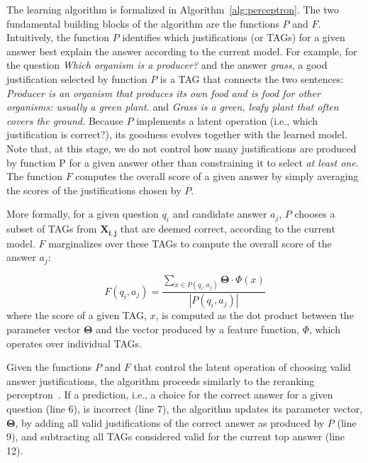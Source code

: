 The learning algorithm is formalized in Algorithm~\ref{alg:perceptron}. The two fundamental building blocks of the algorithm are the functions $P$ and $F$. 
Intuitively, the function $P$ identifies which justifications (or TAGs) for a given answer best explain the answer according to the current model. For example, for the question {\em Which organism is a producer?} and the answer {\em grass}, a good justification selected by function $P$ is a TAG that connects the two sentences: {\em Producer is an organism that produces its own food and is food for other organisms: usually a green plant.} and {\em Grass is a green, leafy plant that often covers the ground.} 
Because $P$ implements a latent operation (i.e., which justification is correct?), its goodness evolves together with the learned model. 
Note that, at this stage, we do not control how many justifications are produced by function P for a given answer other than constraining it to select {\em at least one}. The function $F$ computes the overall score of a given answer by simply averaging the scores of the justifications chosen by $P$. 

More formally, for a given question $q_i$ and candidate answer $a_j$, $P$ chooses a subset of TAGs from $\boldsymbol{X_{i,j}}$ that are deemed correct, according to the current model. $F$ marginalizes over these TAGs to compute the overall score of the answer $a_j$:

\begin{equation}
\label{eq:F}
F(q_i, a_j) = \frac{\sum_{x \in P(q_i, a_j)} \boldsymbol{\Theta} \cdot \Phi(x)}{|P(q_i, a_j)|}
\end{equation}
where the score of a given TAG, $x$, is computed as the dot product between the parameter vector $\boldsymbol{\Theta}$  and the vector produced by a feature function, $\Phi$, which operates over individual TAGs. 

Given the functions $P$ and $F$ that control the latent operation of choosing valid answer justifications, the algorithm proceeds similarly to the reranking perceptron~\cite{Shen:Joshi:2005}. If a prediction, i.e., a choice for the correct answer for a given question (line 6), is incorrect (line 7), the algorithm updates its parameter vector, $\boldsymbol{\Theta}$, by adding all valid justifications of the correct answer as produced by $P$ (line 9), and subtracting all TAGs considered valid for the current top answer (line 12). 


